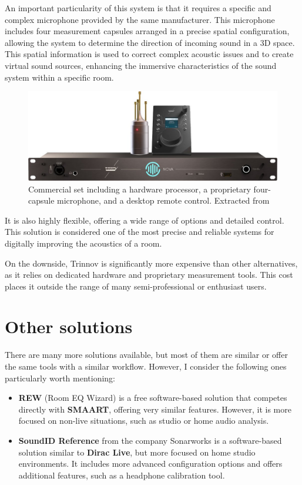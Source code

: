 An important particularity of this system is that it requires a specific and complex microphone provided by the same manufacturer. This microphone includes four measurement capsules arranged in a precise spatial configuration, allowing the system to determine the direction of incoming sound in a 3D space. This spatial information is used to correct complex acoustic issues and to create virtual sound sources, enhancing the immersive characteristics of the sound system within a specific room.

\begin{figure}[H]
	\centering
	\includegraphics[width=0.9
	\linewidth]{Figures/trinnov_set.jpg}
	\caption[Trinnov commercial set]{Commercial set including a hardware processor, a proprietary four-capsule microphone, and a desktop remote control. Extracted from \cite{trinnov_image2}}
	\label{fig:trinnov_hard}
\end{figure}

It is also highly flexible, offering a wide range of options and detailed control. This solution is considered one of the most precise and reliable systems for digitally improving the acoustics of a room.

On the downside, Trinnov is significantly more expensive than other alternatives, as it relies on dedicated hardware and proprietary measurement tools. This cost places it outside the range of many semi-professional or enthusiast users.


\section{Other solutions}

There are many more solutions available, but most of them are similar or offer the same tools with a similar workflow. However, I consider the following ones particularly worth mentioning:

\begin{itemize}
	\item \textbf{REW} (Room EQ Wizard)\cite{rew} is a free software-based solution that competes directly with \textbf{SMAART}, offering very similar features. However, it is more focused on non-live situations, such as studio or home audio analysis.

	\item \textbf{SoundID Reference} from the company Sonarworks \cite{soundID} is a software-based solution similar to \textbf{Dirac Live}, but more focused on home studio environments. It includes more advanced configuration options and offers additional features, such as a headphone calibration tool.
	
\end{itemize}


